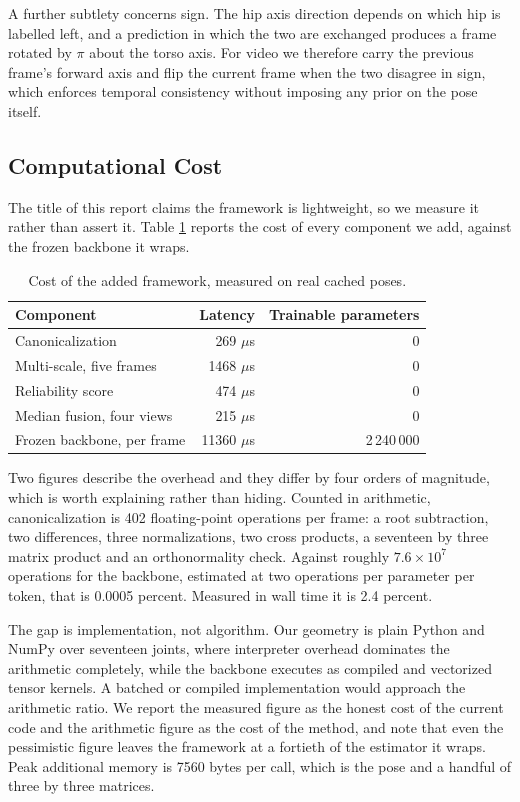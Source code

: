 \documentclass[12pt,a4paper]{report}
\begin{document}
A further subtlety concerns sign. The hip axis direction depends on which hip is labelled left, and a prediction in which the two are exchanged produces a frame rotated by $\pi$ about the torso axis. For video we therefore carry the previous frame's forward axis and flip the current frame when the two disagree in sign, which enforces temporal consistency without imposing any prior on the pose itself.

\subsection{Computational Cost}

The title of this report claims the framework is lightweight, so we measure it rather than assert it. Table \ref{tab:cost} reports the cost of every component we add, against the frozen backbone it wraps.

\begin{table}[htbp]
\centering
\caption{Cost of the added framework, measured on real cached poses.}
\label{tab:cost}
{\fontsize{10}{12}\selectfont
\begin{tabular}{lrr}
\hline
\textbf{Component} & \textbf{Latency} & \textbf{Trainable parameters} \\
\hline
Canonicalization & 269 $\mu$s & 0 \\
Multi-scale, five frames & 1468 $\mu$s & 0 \\
Reliability score & 474 $\mu$s & 0 \\
Median fusion, four views & 215 $\mu$s & 0 \\
\hline
Frozen backbone, per frame & 11360 $\mu$s & 2\,240\,000 \\
\hline
\end{tabular}}
\end{table}

Two figures describe the overhead and they differ by four orders of magnitude, which is worth explaining rather than hiding. Counted in arithmetic, canonicalization is 402 floating-point operations per frame: a root subtraction, two differences, three normalizations, two cross products, a seventeen by three matrix product and an orthonormality check. Against roughly $7.6 \times 10^{7}$ operations for the backbone, estimated at two operations per parameter per token, that is 0.0005 percent. Measured in wall time it is 2.4 percent.

The gap is implementation, not algorithm. Our geometry is plain Python and NumPy over seventeen joints, where interpreter overhead dominates the arithmetic completely, while the backbone executes as compiled and vectorized tensor kernels. A batched or compiled implementation would approach the arithmetic ratio. We report the measured figure as the honest cost of the current code and the arithmetic figure as the cost of the method, and note that even the pessimistic figure leaves the framework at a fortieth of the estimator it wraps. Peak additional memory is 7560 bytes per call, which is the pose and a handful of three by three matrices.
\end{document}
